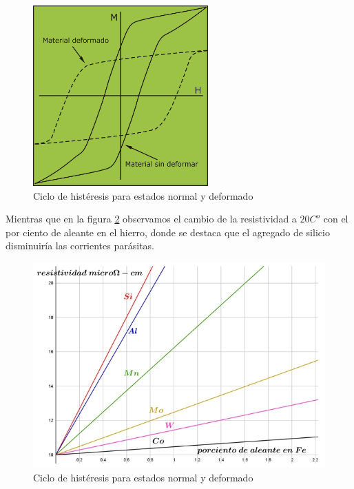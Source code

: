 \begin{figure}[H]
    \centering
    \includegraphics[width=0.6\textwidth]{./Figures/deformacionMecanica}
	\caption{Ciclo de histéresis para estados normal y deformado}
	\label{fig:deformacionMecanica}
\end{figure}


Mientras que en la figura \ref{fig:resistividad} observamos el cambio de la resistividad a $20C^{o}$ con el por ciento de aleante en el hierro, donde se destaca que el agregado de silicio disminuiría las corrientes parásitas.



\begin{figure}[H]
    \centering
    \includegraphics[width=1.0\textwidth]{./Figures/resistividad}
	\caption{Ciclo de histéresis para estados normal y deformado}
	\label{fig:resistividad}
\end{figure}

